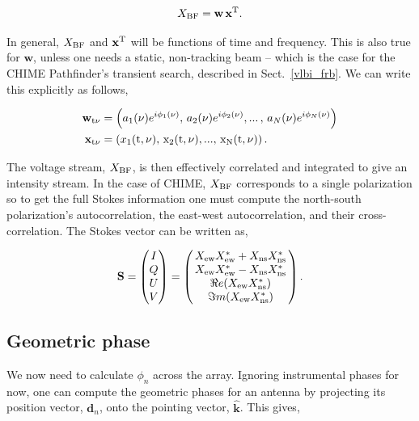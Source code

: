 \begin{equation}
X_{\rm BF} = \mathbf{w} \, \mathbf{x}^{\rm T} .
\end{equation}

\noindent In general, $X_{\rm BF}$ and $\mathbf{x}^{\rm T}$ will be 
functions of time and frequency. This is also true for $\mathbf{w}$,
unless one needs a static, non-tracking beam -- which is the case for the 
CHIME Pathfinder's transient search, described in
Sect.~\ref{vlbi_frb}. We can write this explicitly as follows,


\begin{align}
     \mathbf{w}_{\rm t \nu} &= \left (a_1(\nu) e^{i \phi_1(\nu)}, \, 
     a_2(\nu) e^{i \phi_2(\nu)}, ... \,, \,a_N(\nu) e^{i \phi_N(\nu)} \right )\\
     \mathbf{x}_{\rm t \nu} &= \left ( x_1(\rm{t}, \nu), \, x_2(\rm{t}, \nu), 
     ..., \, x_N(\rm{t}, \nu) \right ).
\end{align}

The voltage stream, $X_{\rm BF}$, is then effectively correlated and integrated 
to give an intensity stream. 
In the case of CHIME, $X_{\rm BF}$ corresponds to a single polarization 
so to get the full Stokes information one must compute the 
north-south polarization's autocorrelation, the east-west autocorrelation, 
and their cross-correlation. The Stokes vector can be written as,

\begin{equation}
\mathbf{S} = 
\begin{pmatrix}
I \\ 
Q \\ 
U\\ 
V
\end{pmatrix}
= \begin{pmatrix}
\, X_{\rm ew} X_{\rm ew}^* + X_{\rm ns} X_{\rm ns}^*\, \\ 
\, X_{\rm ew} X_{\rm ew}^* - X_{\rm ns} X_{\rm ns}^* \,\\ 
\, \Re e(X_{\rm ew} X_{\rm ns}^*)\,\\ 
\, \Im m(X_{\rm ew} X_{\rm ns}^*)\,
\end{pmatrix}.
\end{equation}


\subsection{Geometric phase}

We now need to calculate $\phi_n$ across the array.
Ignoring instrumental phases for now, one can compute the geometric 
phases for an antenna by projecting its position vector, $\mathbf{d}_n$, 
onto the pointing vector, $\hat{\mathbf{k}}$. This gives,

